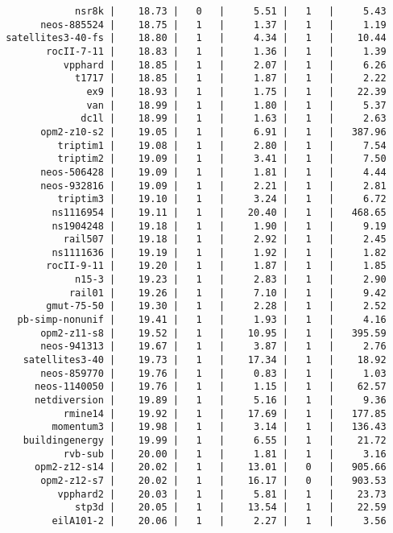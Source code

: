 \begin{verbatim}
             nsr8k |    18.73 |   0   |     5.51 |   1   |     5.43
       neos-885524 |    18.75 |   1   |     1.37 |   1   |     1.19
 satellites3-40-fs |    18.80 |   1   |     4.34 |   1   |    10.44
        rocII-7-11 |    18.83 |   1   |     1.36 |   1   |     1.39
           vpphard |    18.85 |   1   |     2.07 |   1   |     6.26
             t1717 |    18.85 |   1   |     1.87 |   1   |     2.22
               ex9 |    18.93 |   1   |     1.75 |   1   |    22.39
               van |    18.99 |   1   |     1.80 |   1   |     5.37
              dc1l |    18.99 |   1   |     1.63 |   1   |     2.63
       opm2-z10-s2 |    19.05 |   1   |     6.91 |   1   |   387.96
          triptim1 |    19.08 |   1   |     2.80 |   1   |     7.54
          triptim2 |    19.09 |   1   |     3.41 |   1   |     7.50
       neos-506428 |    19.09 |   1   |     1.81 |   1   |     4.44
       neos-932816 |    19.09 |   1   |     2.21 |   1   |     2.81
          triptim3 |    19.10 |   1   |     3.24 |   1   |     6.72
         ns1116954 |    19.11 |   1   |    20.40 |   1   |   468.65
         ns1904248 |    19.18 |   1   |     1.90 |   1   |     9.19
           rail507 |    19.18 |   1   |     2.92 |   1   |     2.45
         ns1111636 |    19.19 |   1   |     1.92 |   1   |     1.82
        rocII-9-11 |    19.20 |   1   |     1.87 |   1   |     1.85
             n15-3 |    19.23 |   1   |     2.83 |   1   |     2.90
            rail01 |    19.26 |   1   |     7.10 |   1   |     9.42
        gmut-75-50 |    19.30 |   1   |     2.28 |   1   |     2.52
   pb-simp-nonunif |    19.41 |   1   |     1.93 |   1   |     4.16
       opm2-z11-s8 |    19.52 |   1   |    10.95 |   1   |   395.59
       neos-941313 |    19.67 |   1   |     3.87 |   1   |     2.76
    satellites3-40 |    19.73 |   1   |    17.34 |   1   |    18.92
       neos-859770 |    19.76 |   1   |     0.83 |   1   |     1.03
      neos-1140050 |    19.76 |   1   |     1.15 |   1   |    62.57
      netdiversion |    19.89 |   1   |     5.16 |   1   |     9.36
           rmine14 |    19.92 |   1   |    17.69 |   1   |   177.85
         momentum3 |    19.98 |   1   |     3.14 |   1   |   136.43
    buildingenergy |    19.99 |   1   |     6.55 |   1   |    21.72
           rvb-sub |    20.00 |   1   |     1.81 |   1   |     3.16
      opm2-z12-s14 |    20.02 |   1   |    13.01 |   0   |   905.66
       opm2-z12-s7 |    20.02 |   1   |    16.17 |   0   |   903.53
          vpphard2 |    20.03 |   1   |     5.81 |   1   |    23.73
             stp3d |    20.05 |   1   |    13.54 |   1   |    22.59
         eilA101-2 |    20.06 |   1   |     2.27 |   1   |     3.56

\end{verbatim}
